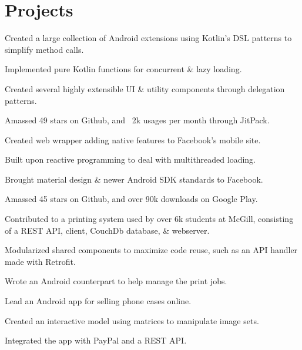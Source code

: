 \documentclass[]{allanwang-resume}
\begin{document}
\begin{minipage}[t]{0.66\textwidth}

	\section{Projects}

	\vspace{\topsep} %
	\begin{tightemize}
		\item Created a large collection of Android extensions using Kotlin's DSL patterns to simplify method calls.
		\item Implemented pure Kotlin functions for concurrent \& lazy loading.
		\item Created several highly extensible UI \& utility components through delegation patterns.
		\item Amassed 49 stars on Github, and ~2k usages per month through JitPack.
	\end{tightemize}

	\begin{tightemize}
		\item Created web wrapper adding native features to Facebook's mobile site.
		\item Built upon reactive programming to deal with multithreaded loading.
		\item Brought material design \& newer Android SDK standards to Facebook.
		\item Amassed 45 stars on Github, and over 90k downloads on Google Play.
	\end{tightemize}

	\begin{tightemize}
		\item Contributed to a printing system used by over 6k students at McGill, consisting of a REST API, client, CouchDb database, \& webserver.
		\item Modularized shared components to maximize code reuse, such as an API handler made with Retrofit.
		\item Wrote an Android counterpart to help manage the print jobs.
	\end{tightemize}

	\begin{tightemize}
		\item Lead an Android app for selling phone cases online.
		\item Created an interactive model using matrices to manipulate image sets.
		\item Integrated the app with PayPal and a REST API.
	\end{tightemize}


\end{minipage}
\end{document}
